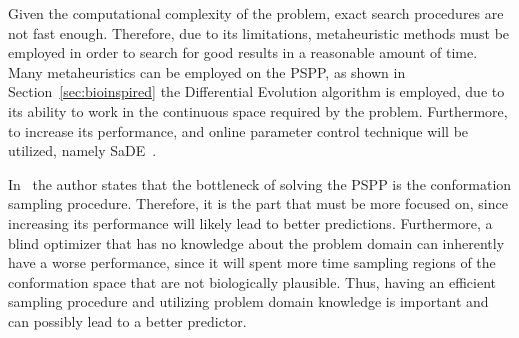 Given the computational complexity of the problem, exact search procedures are
not fast enough. Therefore, due to its limitations,
metaheuristic methods must be employed in order to search for good results
in a reasonable amount of time. Many metaheuristics can be employed
on the \ac{PSPP}, as shown in Section~\ref{sec:bioinspired}
the Differential Evolution algorithm is employed, due to its ability to work
in the continuous space required by the problem. Furthermore, to increase
its performance, and online parameter control technique will be
utilized, namely \ac{SaDE}~\cite{qin2005self,qin2009differential}.
 
In~\cite{kim2009sampling} the author states that the bottleneck of solving the \ac{PSPP} is the conformation sampling procedure. Therefore, it is the part that must be more focused on, since increasing its performance will likely lead to better predictions. Furthermore, a blind optimizer that has no knowledge about the problem domain can inherently have a worse performance, since it will spent more time sampling regions of the conformation space that are not biologically plausible. Thus, having an efficient sampling procedure and utilizing problem domain knowledge is important and can possibly lead to a better predictor.
 
 

